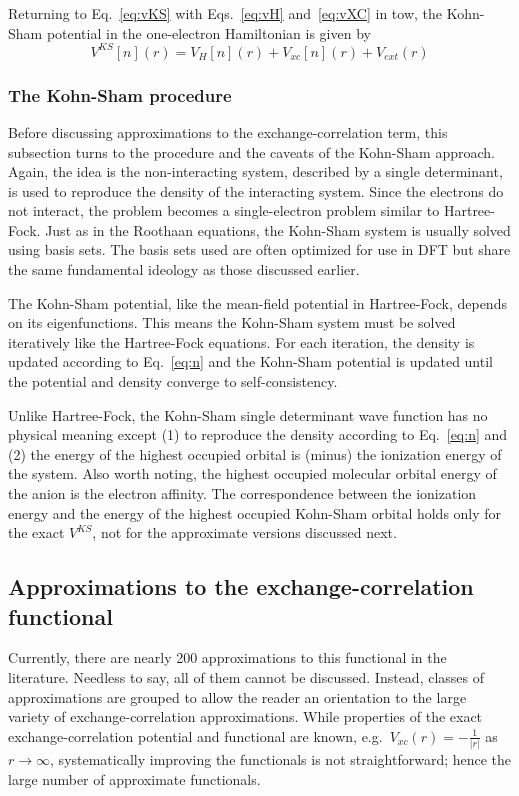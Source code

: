\documentclass[11pt,oneside,final]{huthesis}%
\begin{document}
Returning to Eq.~\eqref{eq:vKS} with Eqs.~\eqref{eq:vH} and~\eqref{eq:vXC} in tow,  the Kohn-Sham potential in the one-electron Hamiltonian is given by
\begin{equation}
V^{KS}[n](r)=V_{H}[n](r)+V_{xc}[n](r)+V_{ext}(r)
\end{equation}

\subsubsection{The Kohn-Sham procedure}
Before discussing approximations to the exchange-correlation term, this subsection turns to the procedure and the caveats of the Kohn-Sham approach.  Again, the idea is the non-interacting system, described by a single determinant, is used to reproduce the density of the interacting system.  Since the electrons do not interact, the problem becomes a single-electron problem similar to Hartree-Fock.  Just as in the Roothaan equations, the Kohn-Sham system is usually solved using basis sets.  The basis sets used are often optimized for use in DFT but share the same fundamental ideology as those discussed earlier.

The Kohn-Sham potential, like the mean-field potential in Hartree-Fock, depends on its eigenfunctions.  This means the Kohn-Sham system must be solved iteratively like the Hartree-Fock equations.  For each iteration, the density is updated according to Eq.~\eqref{eq:n} and the Kohn-Sham potential is updated until the potential and density converge to self-consistency.  

Unlike Hartree-Fock, the Kohn-Sham single determinant wave function has no physical meaning except (1) to reproduce the density according to Eq.~\eqref{eq:n} and (2) the energy of the highest occupied orbital is (minus) the ionization energy of the system.  Also worth noting, the highest occupied molecular orbital energy of the anion is the electron affinity.  The correspondence between the ionization energy and the energy of the highest occupied Kohn-Sham orbital holds only for the exact $V^{KS}$, not for the approximate versions discussed next.  

\subsection{Approximations to the exchange-correlation functional}\label{sec:Exc}
Currently, there are nearly 200 approximations to this functional in the literature.  Needless to say, all of them cannot be discussed.  Instead, classes of approximations are grouped to allow the reader an orientation to the large variety of exchange-correlation approximations.  While properties of the exact exchange-correlation potential and functional are known, e.g.~$V_{xc}(r)=-\frac{1}{|r|}$ as $r\rightarrow\infty$, systematically improving the functionals is not straightforward; hence the large number of approximate functionals.
\end{document}
